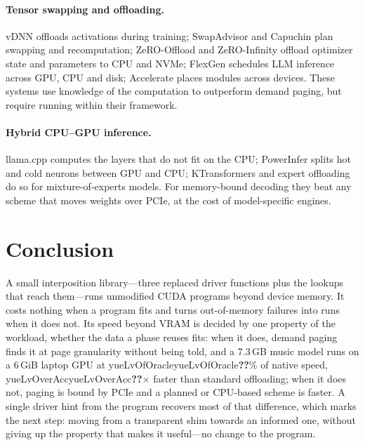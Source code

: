 \documentclass[11pt]{article}
\providecommand{\na}{\textbf{??}}
\newcommand{\num}[1]{\ifcsname #1\endcsname\csname #1\endcsname\else\na\fi}
\begin{document}
\paragraph{Tensor swapping and offloading.} vDNN \cite{vdnn} offloads activations during training;
SwapAdvisor \cite{swapadvisor} and Capuchin \cite{capuchin} plan swapping and recomputation;
ZeRO-Offload and ZeRO-Infinity \cite{zero-offload,zero-infinity} offload optimizer state and
parameters to CPU and NVMe; FlexGen \cite{flexgen} schedules LLM inference across GPU, CPU and
disk; Accelerate \cite{accelerate} places modules across devices. These systems use knowledge of
the computation to outperform demand paging, but require running within their framework.

\paragraph{Hybrid CPU--GPU inference.} llama.cpp \cite{llamacpp} computes the layers that do not
fit on the CPU; PowerInfer \cite{powerinfer} splits hot and cold neurons between GPU and CPU;
KTransformers \cite{ktransformers} and expert offloading \cite{eliseev2023} do so for
mixture-of-experts models. For memory-bound decoding they beat any scheme that moves weights over
PCIe, at the cost of model-specific engines.

\section{Conclusion}

A small interposition library---three replaced driver functions plus the lookups that reach
them---runs unmodified CUDA programs beyond device memory. It costs nothing when a program fits and
turns out-of-memory failures into runs when it does not. Its speed beyond VRAM is decided by one
property of the workload, whether the data a phase reuses fits: when it does, demand paging finds
it at page granularity without being told, and a 7.3\,GB music model runs on a 6\,GiB laptop GPU
at \num{yueLvOfOracle}\% of native speed, \num{yueLvOverAcc}$\times$ faster than standard
offloading; when it does not, paging is bound by PCIe and a planned or CPU-based scheme is faster.
A single driver hint from the program recovers most of that difference, which marks the next step:
moving from a transparent shim towards an informed one, without giving up the property that makes
it useful---no change to the program.



\end{document}
